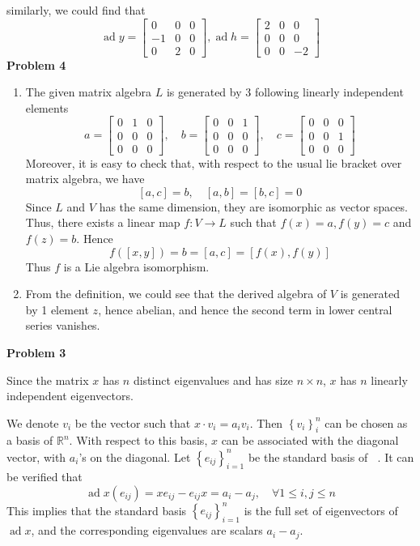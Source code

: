 \documentclass[12pt]{article} %
\DeclareMathOperator{\ad}{ad}
\DeclareMathOperator{\gl}{\mathfrak{\mathfrak{gl}}(n,F)}
\begin{document}
similarly, we could find that
\[\ad y = \begin{bmatrix}
        0  & 0 & 0 \\
        -1 & 0 & 0 \\
        0  & 2 & 0
    \end{bmatrix} ,  \ad h = \begin{bmatrix}
        2 & 0 & 0  \\
        0 & 0 & 0  \\
        0 & 0 & -2
    \end{bmatrix}\]
\textbf{Problem 4}
\begin{enumerate}
    \item The given matrix algebra $L$ is generated by 3 following linearly independent elements
          \[ a =\begin{bmatrix}
                  0 & 1 & 0 \\
                  0 & 0 & 0 \\
                  0 & 0 & 0
              \end{bmatrix}, \quad b = \begin{bmatrix}
                  0 & 0 & 1 \\
                  0 & 0 & 0 \\
                  0 & 0 & 0
              \end{bmatrix}, \quad c=\begin{bmatrix}
                  0 & 0 & 0 \\
                  0 & 0 & 1 \\
                  0 & 0 & 0
              \end{bmatrix} \]
          Moreover, it is easy to check that, with respect to the usual lie bracket over matrix algebra, we have
          \[[a,c] = b, \quad [a,b]=[b,c] = 0\]
          Since $L$ and $V$ has the same dimension, they are isomorphic as vector spaces. Thus, there exists a linear map $f \colon V \to L$ such that
          $f(x)=a, f(y)=c$ and $f(z)=b$. Hence
          \[f([x,y]) = b = [a,c] = [f(x),f(y)]\]
          Thus $f$ is a Lie algebra isomorphism.
    \item From the definition, we could see that the derived algebra of $V$ is generated by 1 element $z$, hence abelian, and hence the second term
          in lower central series vanishes.

\end{enumerate}
\textbf{Problem 3}

Since the matrix $x$ has $n$ distinct eigenvalues and has size $n \times n$, $x$ has $n$ linearly independent eigenvectors.

We denote $v_i$ be the vector such that $x\cdot v_i = a_iv_i$. Then $\left\lbrace v_i\right\rbrace_i^n$ can be chosen as a basis of $\mathbb{R}^n$.
With respect to this basis, $x$ can be associated with the diagonal vector, with $a_i$'s on the diagonal. Let $\left\lbrace e_{ij}\right\rbrace_{i=1}^n$ be the standard basis of $\gl$.
It can be verified that
\[\ad x(e_{ij}) = xe_{ij} -e_{ij}x = a_i -a_j, \quad \forall 1 \le i,j \le n\]
This implies that the standard basis $\left\lbrace e_{ij}\right\rbrace_{i=1}^n$ is the full set of eigenvectors of $\ad x$, and the corresponding eigenvalues are scalars $a_i-a_j$.
\end{document}
